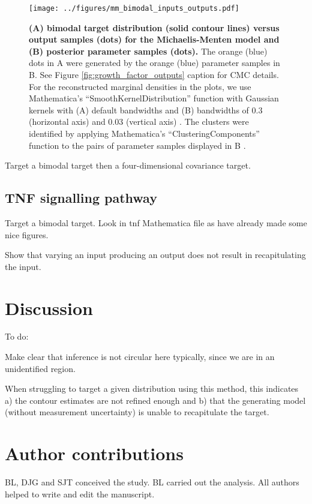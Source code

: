 \documentclass[10pt,letterpaper]{article}
\begin{document}
\begin{figure}[H]
	\centerline{\texttt{[image: ../figures/mm\_bimodal\_inputs\_outputs.pdf]}}
	\caption{\textbf{(A) bimodal target distribution (solid contour lines) versus output samples (dots) for the Michaelis-Menten model and (B) posterior parameter samples (dots).} The orange (blue) dots in A were generated by the orange (blue) parameter samples in B. See Figure \ref{fig:growth_factor_outputs} caption for CMC details. For the reconstructed marginal densities in the plots, we use Mathematica's ``SmoothKernelDistribution'' function with Gaussian kernels with (A) default bandwidths and (B) bandwidths of 0.3 (horizontal axis) and 0.03 (vertical axis) \cite{mathematica}. The clusters were identified by applying Mathematica's ``ClusteringComponents'' function to the pairs of parameter samples displayed in B \cite{mathematica}.}
	\label{fig:mm_bimodal_inputs_outputs}
\end{figure}



Target a bimodal target then a four-dimensional covariance target.

\subsection{TNF signalling pathway}
Target a bimodal target. Look in tnf Mathematica file as have already made some nice figures.

Show that varying an input producing an output does not result in recapitulating the input.


\section{Discussion}
\label{sec:discussion}
To do:

Make clear that inference is not circular here typically, since we are in an unidentified region.

When struggling to target a given distribution using this method, this indicates a) the contour estimates are not refined enough and b) that the generating model (without measurement uncertainty) is unable to recapitulate the target.


\section{Author contributions}
BL, DJG and SJT conceived the study. BL carried out the analysis. All authors helped to write and edit the manuscript.


\nolinenumbers



\end{document}
